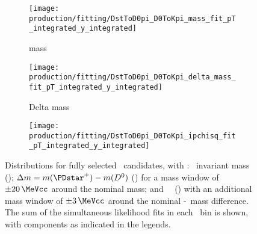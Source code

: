 \begin{figure}
  \begin{subfigure}[b]{0.5\textwidth}
    \centering
    \texttt{[image: production/fitting/DstToD0pi\_D0ToKpi\_mass\_fit\_pT\_integrated\_y\_integrated]}
    \caption{\PDzero mass}
    \label{fig:prod:fitting:DstToD0pi_D0ToKpi:mass}
  \end{subfigure}
  \begin{subfigure}[b]{0.5\textwidth}
    \centering
    \texttt{[image: production/fitting/DstToD0pi\_D0ToKpi\_delta\_mass\_fit\_pT\_integrated\_y\_integrated]}
    \caption{Delta mass}
    \label{fig:prod:fitting:DstToD0pi_D0ToKpi:delta_mass}
  \end{subfigure}
  \begin{subfigure}[b]{0.5\textwidth}
    \centering
    \texttt{[image: production/fitting/DstToD0pi\_D0ToKpi\_ipchisq\_fit\_pT\_integrated\_y\_integrated]}
    \caption{\lnipchisq}
    \label{fig:prod:fitting:DstToD0pi_D0ToKpi:ipchisq}
  \end{subfigure}
  \caption{%
    Distributions for fully selected \PDstarp\ candidates, with \DzToKpi: 
    \PDzero\ invariant mass 
    (); $\deltam = m(\PDstarp) 
    - m(\PDzero)$ () for 
    a mass window of $\pm\SI{20}{\MeVcc}$ around the nominal \PDzero mass; and 
    \PDzero\ \lnipchisq\ () 
    with an additional mass window of $\pm\SI{3}{\MeVcc}$ around the nominal 
    \PDstarp-\PDzero\ mass difference.
    The sum of the simultaneous likelihood fits in each \pTy\ bin is shown, 
    with components as indicated in the legends.
  }
  \label{fig:prod:fitting:DstToD0pi_D0ToKpi}
\end{figure}

\begin{sidewaystable}
  \caption{%
    Prompt signal yields for \DzToKpi\ measured in \PDzero \pTy\ bins.
    Cells marked with a dash `-' indicate bins where insufficient data were 
    available for a statistically significant prompt signal yield measurement.
  }
  \label{tab:prod:fitting:D0ToKpi}
  \centering
  
\end{sidewaystable}

\begin{sidewaystable}
  \caption{%
    Prompt signal yields for \DpToKpipi\ measured in \PDplus \pTy\ bins.
    Cells marked with a dash `-' indicate bins where insufficient data were 
    available for a statistically significant prompt signal yield measurement.
  }
  \label{tab:prod:fitting:DpToKpipi}
  \centering
  
\end{sidewaystable}

